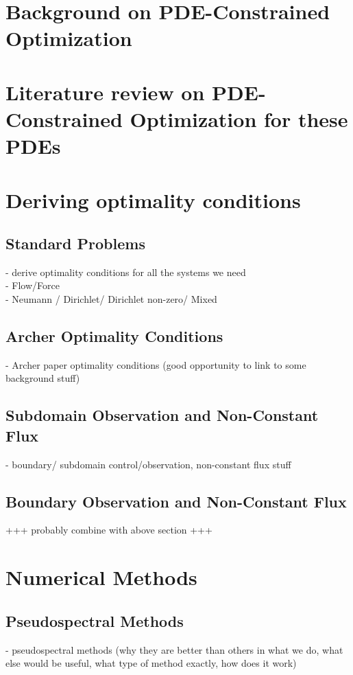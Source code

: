 \documentclass[11pt, a4paper]{article}
\theoremstyle{definition}
\begin{document}
\section{Background on PDE-Constrained Optimization}
\section{Literature review on PDE-Constrained Optimization for these PDEs}

\section{Deriving optimality conditions}

\subsection{Standard Problems}
- derive optimality conditions for all the systems we need \\
- Flow/Force\\
- Neumann / Dirichlet/ Dirichlet non-zero/ Mixed\\
\subsection{Archer Optimality Conditions}
- Archer paper optimality conditions (good opportunity to link to some background stuff)

\subsection{Subdomain Observation and Non-Constant Flux}
- boundary/ subdomain control/observation, non-constant flux stuff\\

\subsection{Boundary Observation and Non-Constant Flux}
+++ probably combine with above section +++
%
\section{Numerical Methods}
\subsection{Pseudospectral Methods}
- pseudospectral methods (why they are better than others in what we do, what else would be useful, what type of method exactly, how does it work)
\end{document}
